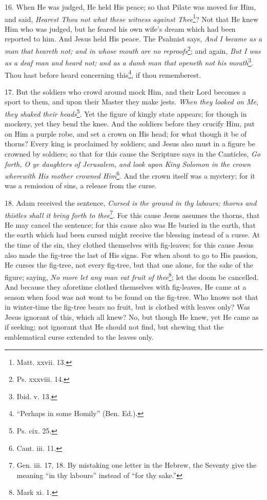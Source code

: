 16. When He was judged, He held His peace; so that Pilate was moved for Him, and said, \emph{Hearest Thou not what these witness against Thee}\footnote{Matt. xxvii. 13.}? Not that He knew Him who was judged, but he feared his own wife’s dream which had been reported to him. And Jesus held His peace. The Psalmist says, \emph{And I became as a man that heareth not; and in whose mouth are no reproofs}\footnote{Ps. xxxviii. 14.}; and again, \emph{But I was as a deaf man and heard not; and as a dumb man that openeth not his mouth}\footnote{Ibid. v. 13.}. Thou hast before heard concerning this\footnote{“Perhaps in some Homily” (Ben. Ed.).}, if thou rememberest.

17. But the soldiers who crowd around mock Him, and their Lord becomes a sport to them, and upon their Master they make jests. \emph{When they looked on Me, they shaked their heads}\footnote{Ps. cix. 25.}. Yet the figure of kingly state appears; for though in mockery, yet they bend the knee. And the soldiers before they crucify Him, put on Him a purple robe, and set a crown on His head; for what though it be of thorns? Every king is proclaimed by soldiers; and Jesus also must in a figure be crowned by soldiers; so that for this cause the Scripture says in the Canticles, \emph{Go forth, O ye daughters of Jerusalem, and look upon King Solomon in the crown wherewith His mother crowned Him}\footnote{Cant. iii. 11.}. And the crown itself was a mystery; for it was a remission of sins, a release from the curse.

18. Adam received the sentence, \emph{Cursed is the ground in thy labours; thorns and thistles shall it bring forth to thee}\footnote{Gen. iii. 17, 18. By mistaking one letter in the Hebrew, the Seventy give the meaning “in thy labours” instead of “for thy sake.”}. For this cause Jesus assumes the thorns, that He may cancel the sentence; for this cause also was He buried in the earth, that the earth which had been cursed might receive the blessing instead of a curse. At the time of the sin, they clothed themselves with fig-leaves; for this cause Jesus also made the fig-tree the last of His signs. For when about to go to His passion, He curses the fig-tree, not every fig-tree, but that one alone, for the sake of the figure; saying, \emph{No more let any man eat fruit of thee}\footnote{Mark xi. 1.}; let the doom be cancelled. And because they aforetime clothed themselves with fig-leaves, He came at a season when food was not wont to be found on the fig-tree. Who knows not that in winter-time the fig-tree bears no fruit, but is clothed with leaves only? Was Jesus ignorant of this, which all knew? No, but though He knew, yet He came as if seeking; not ignorant that He should not find, but shewing that the emblematical curse extended to the leaves only.

